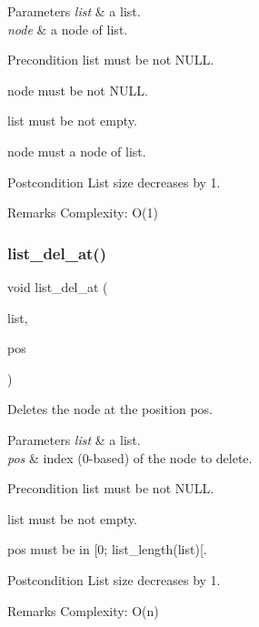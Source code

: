 \begin{DoxyParams}{Parameters}
{\em list} & a list. \\
\hline
{\em node} & a node of {\ttfamily list}.\\
\hline
\end{DoxyParams}
\begin{DoxyPrecond}{Precondition}
{\ttfamily list} must be not N\+U\+LL. 

{\ttfamily node} must be not N\+U\+LL. 

{\ttfamily list} must be not empty. 

{\ttfamily node} must a node of {\ttfamily list}.
\end{DoxyPrecond}
\begin{DoxyPostcond}{Postcondition}
List size decreases by 1.
\end{DoxyPostcond}
\begin{DoxyRemark}{Remarks}
Complexity\+: O(1) 
\end{DoxyRemark}
\mbox{\label{list_8c_a1b32056f04fe6cce76bc8774b462598f}} 
\subsubsection{list\+\_\+del\+\_\+at()}
{\footnotesize\ttfamily void list\+\_\+del\+\_\+at (\begin{DoxyParamCaption}\item[{struct \textbf{ list} $\ast$}]{list,  }\item[{size\+\_\+t}]{pos }\end{DoxyParamCaption})\hspace{0.3cm}{\ttfamily [inline]}}

Deletes the node at the position {\ttfamily pos}.


\begin{DoxyParams}{Parameters}
{\em list} & a list. \\
\hline
{\em pos} & index (0-\/based) of the node to delete.\\
\hline
\end{DoxyParams}
\begin{DoxyPrecond}{Precondition}
{\ttfamily list} must be not N\+U\+LL. 

{\ttfamily list} must be not empty. 

{\ttfamily pos} must be in [0; list\+\_\+length(list)[.
\end{DoxyPrecond}
\begin{DoxyPostcond}{Postcondition}
List size decreases by 1.
\end{DoxyPostcond}
\begin{DoxyRemark}{Remarks}
Complexity\+: O(n) 
\end{DoxyRemark}
\mbox{\label{list_8c_ab31246f096207d08b4756bd2c209fa2b}} 
